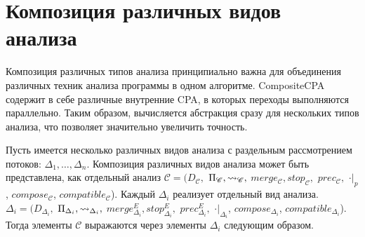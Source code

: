 \section{Композиция различных видов анализа}
\label{sect_composite_analysis}

Композиция различных типов анализа принципиально важна для объединения различных техник анализа программы в одном алгоритме.
CompositeCPA содержит в себе различные внутренние CPA, в которых переходы выполняются параллельно.
Таким образом, вычисляется абстракция сразу для нескольких типов анализа, что позволяет значительно увеличить точность.

Пусть имеется несколько различных видов анализа с раздельным рассмотрением потоков: $\Delta_1, \dots, \Delta_n$. 
Композиция различных видов анализа может быть представлена, как отдельный анализ $\mathscr{C}=(D_{\mathscr{C}},$ $\Pi_{\mathscr{C}}, \leadsto_{\mathscr{C}},$ $merge_{\mathscr{C}}, stop_{\mathscr{C}},$ $prec_{\mathscr{C}},$ $\cdot|_p$, $compose_{\mathscr{C}}$, $compatible_{\mathscr{C}}$).
Каждый $\Delta_i$ реализует отдельный вид анализа. 
$\Delta_i=(D_{\Delta_i},$ $\Pi_{\Delta_i}, \leadsto_{\Delta_i},$ $merge^E_{\Delta_i}, stop^E_{\Delta_i},$ $prec^E_{\Delta_i},$ $\cdot|_{\Delta_i}$, $compose_{\Delta_i}$, $compatible_{\Delta_i}$). 
Тогда элементы $\mathscr{C}$ выражаются через элементы $\Delta_i$ следующим образом.


